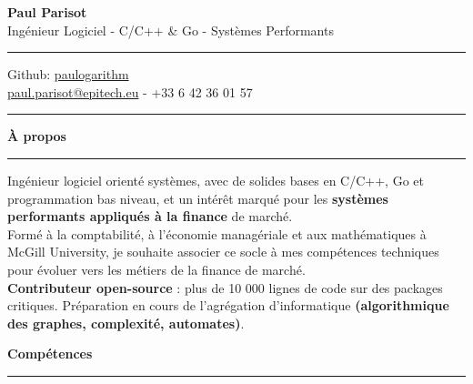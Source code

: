 \documentclass[9pt]{extarticle}
\begin{document}
\begin{center}
	{\huge\bfseries Paul Parisot}
	\\[4pt]
	{\Large Ingénieur Logiciel - C/C++ \& Go - Systèmes Performants}
	\\
\end{center}

\par\vspace{-5pt}
\rule{\linewidth}{0.4pt}
\par\vspace{-5pt}

\begin{center}
	Github: \href{https://github.com/paulogarithm}{paulogarithm}
	\\
	\href{mailto:paul.parisot@epitech.eu}{paul.parisot@epitech.eu} - +33 6 42 36 01 57
	\\
\end{center}

\par\vspace{-10pt}
\rule{\linewidth}{0.4pt}
\par\vspace{7pt}

{\large\bfseries À propos}
\par\vspace{-8pt}
\rule{\linewidth}{0.4pt}
\par\vspace{5pt}

Ingénieur logiciel orienté systèmes, avec de solides bases en C/C++, Go et programmation bas niveau, et un intérêt marqué pour les {\bfseries systèmes performants appliqués à la finance} de marché.
\\
Formé à la comptabilité, à l'économie managériale et aux mathématiques à McGill University, je souhaite associer ce socle à mes compétences techniques pour évoluer vers les métiers de la finance de marché.
\\
{\bfseries Contributeur open-source} : plus de 10 000 lignes de code sur des packages critiques. Préparation en cours de l'agrégation d'informatique {\bfseries (algorithmique des graphes, complexité, automates)}.
\par\vspace{5pt}

{\large\bfseries Compétences}
\par\vspace{-8pt}
\rule{\linewidth}{0.4pt}
\par\vspace{5pt}
\end{document}
